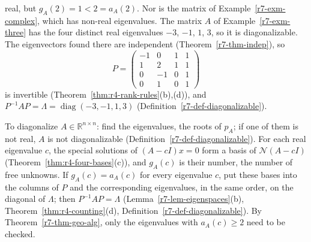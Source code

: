 \documentclass[12pt]{article}
\newcommand{\R}{\mathbb R}
\DeclareMathOperator{\diag}{diag}
\theoremstyle{definition}
\begin{document}
real, but \(g_A(2)=1<2=a_A(2)\). Nor is the matrix of Example~\ref{r7-exm-complex}, which has non-real eigenvalues.
The matrix \(A\) of Example~\ref{r7-exm-three} has the four distinct real eigenvalues \(-3\), \(-1\), \(1\), \(3\), so it is
diagonalizable. The eigenvectors found there are independent (Theorem~\ref{r7-thm-indep}), so
\[
P=\begin{pmatrix}-1&0&1&1\\1&2&1&1\\0&-1&0&1\\0&1&0&1\end{pmatrix}
\]
is invertible (Theorem~\ref{thm:r4-rank-rules}(b),(d)), and \(P^{-1}AP=\Lambda=\diag(-3,-1,1,3)\)
(Definition~\ref{r7-def-diagonalizable}).

To diagonalize \(A\in\R^{n\times n}\): find the eigenvalues, the roots of \(p_A\); if one of them is not real, \(A\) is not
diagonalizable (Definition~\ref{r7-def-diagonalizable}). For each real eigenvalue \(c\), the special solutions of \((A-cI)x=0\) form a basis of
\(\mathcal N(A-cI)\) (Theorem~\ref{thm:r4-four-bases}(c)), and \(g_A(c)\) is their number, the number of free unknowns.
If \(g_A(c)=a_A(c)\) for every eigenvalue \(c\), put these bases into the columns of \(P\) and the corresponding
eigenvalues, in the same order, on the diagonal of \(\Lambda\); then \(P^{-1}AP=\Lambda\)
(Lemma~\ref{r7-lem-eigenspaces}(b), Theorem~\ref{thm:r4-counting}(d), Definition~\ref{r7-def-diagonalizable}). By
Theorem~\ref{r7-thm-geo-alg}, only the eigenvalues with \(a_A(c)\geqslant2\) need to be checked.
\end{document}
